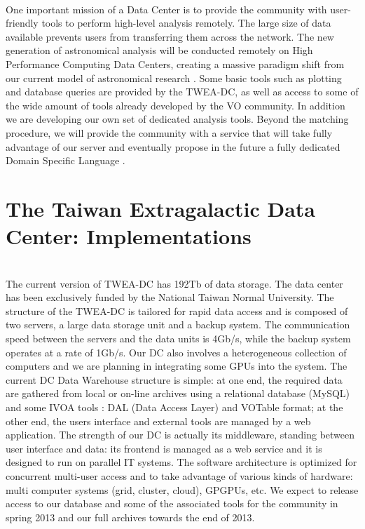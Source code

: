\\
One important mission of a Data Center is to provide the community with user-friendly tools to perform high-level analysis remotely. The large size of data available prevents users from transferring them across the network. The new generation of astronomical analysis will be conducted remotely on High Performance Computing Data Centers, creating a massive paradigm shift from our current model of astronomical research \citep[the {\it Fourth Paradigm} -][]{fourthpar}. Some basic tools such as plotting and database queries are provided by the TWEA-DC, as well as access to some of the wide amount of tools already developed by the VO community. In addition we are developing our own set of dedicated analysis tools. Beyond the matching procedure, we will provide the community with a service that will take fully advantage of our server and eventually propose in the future a fully dedicated Domain Specific Language \citep{O18_adassxxii}.

\section{The Taiwan Extragalactic Data Center: Implementations}

\\
The current version of TWEA-DC has 192Tb of data storage. The data center has been exclusively funded by the National Taiwan Normal University.  The structure of the TWEA-DC is tailored for rapid data access and is composed of two servers, a large data storage unit and a backup system. The communication speed between the servers and the data units is 4Gb/s, while the backup system operates at a rate of 1Gb/s. Our DC also involves a heterogeneous collection of computers and we are planning in integrating some GPUs into the system. The current DC Data Warehouse structure is simple: at one end, the required data are gathered from local or on-line archives using a relational database (MySQL) and some IVOA tools : DAL (Data Access Layer) and VOTable format; at the other end, the users interface and external tools are managed by a web application. The strength of our DC is actually its middleware, standing between user interface and data: its frontend is managed as a web service and it is designed to run on parallel IT systems. The software architecture is optimized for concurrent multi-user access and to take advantage of various kinds of hardware: multi computer systems (grid, cluster, cloud), GPGPUs, etc. We expect to release access to our database and some of the associated tools for the community in spring 2013 and our full archives towards the end of 2013.\\

